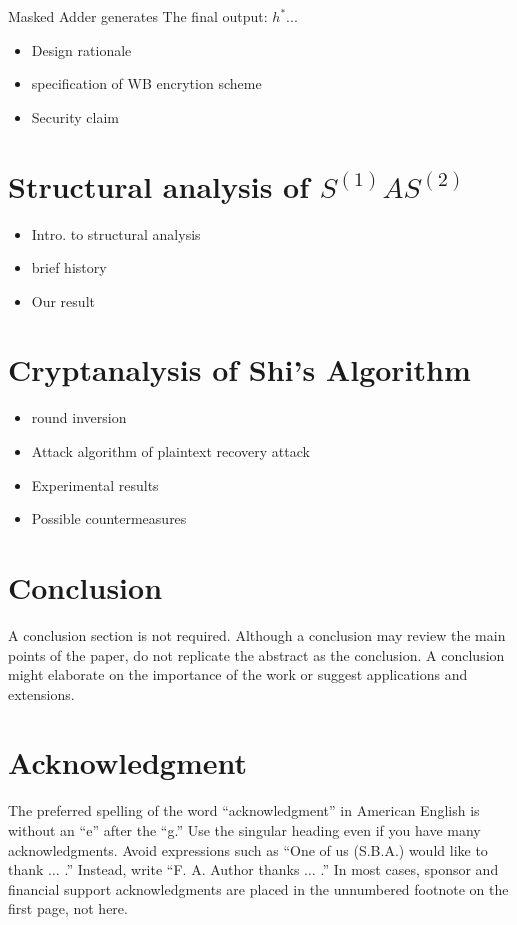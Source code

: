 \documentclass{ieeeaccess}
\begin{document}
Masked Adder generates
The final output: $h^*...$


\begin{itemize}
\item Design rationale
\item specification of WB encrytion scheme
\item Security claim
\end{itemize}


\section{Structural analysis of $S^{(1)}AS^{(2)}$}

\begin{itemize}
\item Intro. to structural analysis
\item brief history
\item Our result
\end{itemize}

\section{Cryptanalysis of Shi's Algorithm}

\begin{itemize}
\item round inversion
\item Attack algorithm of plaintext recovery attack
\item Experimental results
\item Possible countermeasures
\end{itemize}


\section{Conclusion}
A conclusion section is not required. Although a conclusion may review the 
main points of the paper, do not replicate the abstract as the conclusion. A 
conclusion might elaborate on the importance of the work or suggest 
applications and extensions. 

\section*{Acknowledgment}

The preferred spelling of the word ``acknowledgment'' in American English is 
without an ``e'' after the ``g.'' Use the singular heading even if you have 
many acknowledgments. Avoid expressions such as ``One of us (S.B.A.) would 
like to thank $\ldots$ .'' Instead, write ``F. A. Author thanks $\ldots$ .'' In most 
cases, sponsor and financial support acknowledgments are placed in the 
unnumbered footnote on the first page, not here.
\end{document}
